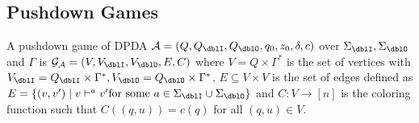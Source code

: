 %

\subsection{Pushdown Games}

\begin{definition}
A {pushdown game} of DPDA $\calA = (Q, Q_\dblI, Q_\dblO, q_0, z_0, \delta, c)$ over $\Sigma_\dblI, \Sigma_\dblO$ and $\Gamma$ is $\calG_\calA = (V, V_\dblI, V_\dblO, E, C)$ where
$V = Q\times\Gamma^*$ is the set of vertices with $V_\dblI = Q_\dblI\times\Gamma^*, V_\dblO = Q_\dblO\times\Gamma^*$, $E\subseteq V\times V$ is the set of edges defined as $E = \{(v,v') \mid v \vdash^a v' \text{for some $a\in \Sigma_\dblI\cup\Sigma_\dblO$}\}$
and $C: V \to [n]$ is the coloring function such that
$C((q,u)) = c(q)$ for all $(q,u)\in V$.
\end{definition}

